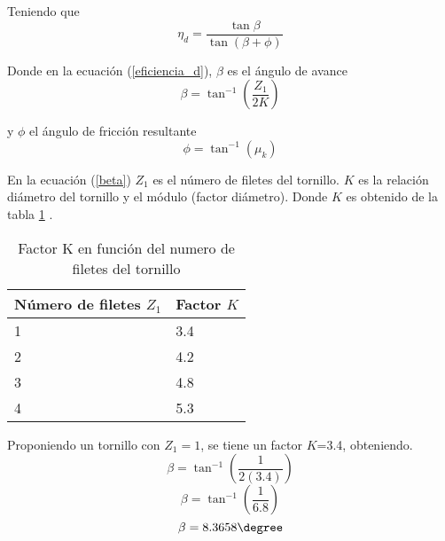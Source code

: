 Teniendo que
\begin{equation} \label{eficiencia_d}
    \eta_d=\frac{\tan{\beta}}{\tan{(\beta+\phi)}}
\end{equation}

Donde en la ecuación (\ref{eficiencia_d}), $\beta$ es el ángulo de avance
\begin{equation} \label{beta}
    \beta=\tan^{-1}\left( \frac{Z_1}{2K}\right)
\end{equation}

y $\phi$ el ángulo de fricción resultante
\begin{equation}\label{phi}
    \phi=\tan^{-1}\left( \mu_k \right)
\end{equation}

En la ecuación (\ref{beta}) \hfill \break $Z_1$ es el número de filetes del tornillo.\hfill \break
$K$ es la relación diámetro del tornillo y el módulo (factor diámetro).\hfill \break
Donde $K$ es obtenido de la tabla \ref{tab:FactorK} \cite{Rodríguez2015}.

\footnotesize
\begin{longtable}[!htb]{| m{15em}| m{10em}|}
\caption{Factor K en función del numero de filetes del tornillo}
\label{tab:FactorK} \\
\hline\hline
\textbf{Número de filetes $Z_1$}& \textbf{Factor $K$} \\
\hline\hline
1 & 3.4 \\
\hline
2 & 4.2 \\
\hline
3 & 4.8 \\
\hline
4 & 5.3 \\
\hline 
\end{longtable}
Proponiendo un tornillo con $Z_1=1$, se tiene un factor $K$=3.4, obteniendo.
\begin{equation*}
    \beta=\tan^{-1}\left( \frac{1}{2(3.4)}\right)
\end{equation*}
\begin{equation*}
    \beta=\tan^{-1}\left( \frac{1}{6.8}\right)
\end{equation*}
\begin{equation*}
    \beta=8.3658\degree
\end{equation*}

